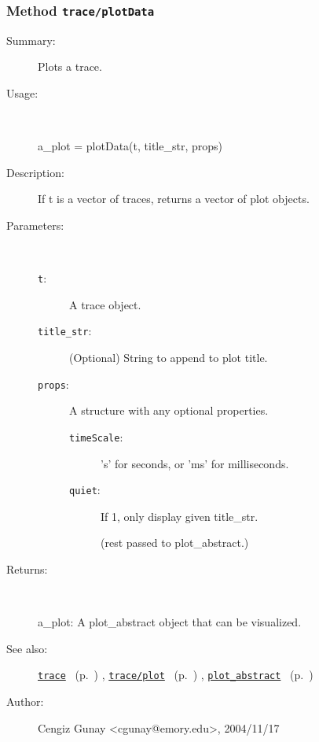 \subsubsection[Method \texttt{plotData}]{Method \texttt{trace/plotData}}%
%
\label{ref_trace__plotData}%
\hypertarget{ref_trace__plotData}{}%
\begin{description}
\item[Summary:]Plots a trace.
%
\item[Usage:]~%
\begin{lyxcode}%
a\_plot = plotData(t, title\_str, props)
%
\end{lyxcode}%
%
\item[Description:]%
If t is a vector of traces, returns a vector of plot objects.
\item[Parameters:]~
\begin{description}%
\item[\texttt{t}:]
 A trace object.
\item[\texttt{title\_str}:]
 (Optional) String to append to plot title.
\item[\texttt{props}:]
 A structure with any optional properties.
\begin{description}%
\item[\texttt{timeScale}:]
 's' for seconds, or 'ms' for milliseconds.
\item[\texttt{quiet}:]
 If 1, only display given title\_str.

(rest passed to plot\_abstract.)
\end{description}%
\end{description}%
%
\item[Returns:
]~

	a\_plot: A plot\_abstract object that can be visualized.
%
%
\item[See also:]%
\hyperlink{ref_trace}{\texttt{trace}}%
\ (p.~\pageref{ref_trace})%
%
, \hyperlink{ref_trace__plot}{\texttt{trace/plot}}%
\ (p.~\pageref{ref_trace__plot})%
%
, \hyperlink{ref_plot_abstract}{\texttt{plot\_abstract}}%
\ (p.~\pageref{ref_plot_abstract})%
%
%
\item[Author:]%
Cengiz Gunay <cgunay@emory.edu>, 2004/11/17
%
\end{description}
\methodline%
